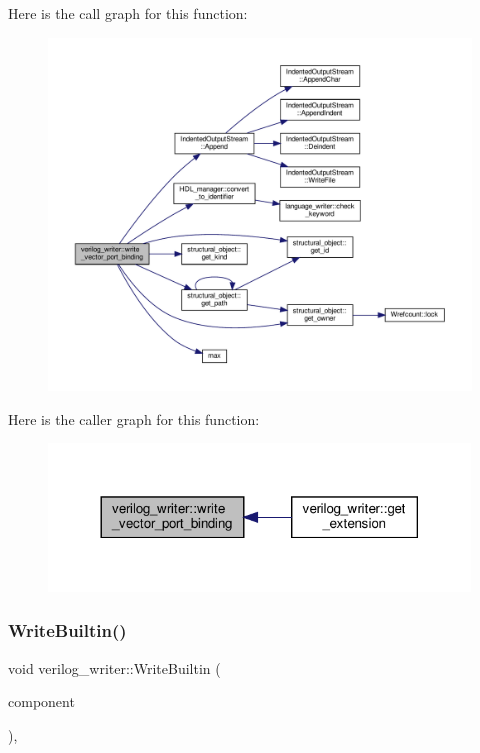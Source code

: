 Here is the call graph for this function\+:
\nopagebreak
\begin{figure}[H]
\begin{center}
\leavevmode
\includegraphics[width=350pt]{d8/dba/classverilog__writer_ab9c4a8bd3452e3bb5d3efd13638b48c3_cgraph}
\end{center}
\end{figure}
Here is the caller graph for this function\+:
\nopagebreak
\begin{figure}[H]
\begin{center}
\leavevmode
\includegraphics[width=317pt]{d8/dba/classverilog__writer_ab9c4a8bd3452e3bb5d3efd13638b48c3_icgraph}
\end{center}
\end{figure}
\mbox{\label{classverilog__writer_ae6de8e08344d96fdc22cfef1974b59fa}} 
\subsubsection{\texorpdfstring{Write\+Builtin()}{WriteBuiltin()}}
{\footnotesize\ttfamily void verilog\+\_\+writer\+::\+Write\+Builtin (\begin{DoxyParamCaption}\item[{const structural\+\_\+object\+Const\+Ref}]{component }\end{DoxyParamCaption})\hspace{0.3cm}{\ttfamily [override]}, {\ttfamily [virtual]}}



